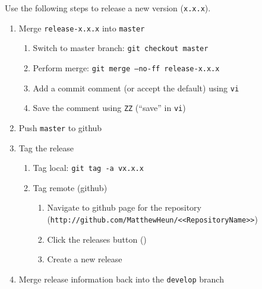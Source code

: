 \documentclass{article}
\begin{document}
Use the following steps to release a new version (\texttt{x.x.x}).

\begin{enumerate}

  \item Merge \texttt{release-x.x.x} into \texttt{master}
  \begin{enumerate}

    \item Switch to master branch: \texttt{git checkout master} 

    \item Perform merge: \texttt{git merge --no-ff release-x.x.x}
	
	\item Add a commit comment (or accept the default) using \texttt{vi} 
	
	\item Save the comment using \texttt{ZZ} (``save'' in \texttt{vi})

  \end{enumerate}
  \item Push \texttt{master} to github
  
  \item Tag the release
  \begin{enumerate}

    \item Tag local: \texttt{git tag -a vx.x.x}

    \item Tag remote (github)
	\begin{enumerate}

	  \item Navigate to github page for the repository\\
	  		(\texttt{http://github.com/MatthewHeun/<<RepositoryName>>})

	  \item Click the releases button ()
	  
	  \item Create a new release

	\end{enumerate}

  \end{enumerate}
  \item Merge release information back into the \texttt{develop} branch
  \begin{enumerate}


\end{enumerate}
\end{enumerate}
\end{document}
